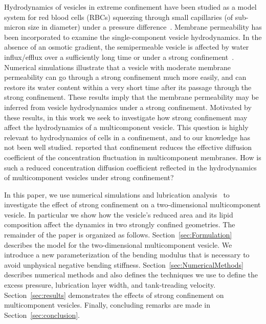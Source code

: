 \documentclass[twoside,twocolumn,9pt]{article}
\begin{document}
Hydrodynamics of vesicles in extreme confinement have been studied as a
model system for red blood cells (RBCs) squeezing through small
capillaries (of sub-micron size in diameter) under a pressure
difference~\cite{Freund2013_PoF, LuPeng2019_PoF, che-lyu-jae-leo2020,
gur-pak-tay-siv-sac2023}. Membrane permeability has been incorporated to
examine the single-component vesicle hydrodynamics. In the absence of an
osmotic gradient, the semipermeable vesicle is affected by water
influx/efflux over a sufficiently long time or under a strong
confinement~\cite{qua-gan-you2021}. Numerical simulations illustrate
that a vesicle with moderate membrane permeability can go through a
strong confinement much more easily, and can restore its water content
within a very short time after its passage through the strong
confinement. These results imply that the membrane permeability may be
inferred from vesicle hydrodynamics under a strong confinement.
Motivated by these results, in this work we seek to investigate how
strong confinement may affect the hydrodynamics of a multicomponent
vesicle. This question is highly relevant to hydrodynamics of cells in a
confinement, and to our knowledge has not been well studied.
\citet{ram-kom-sek-ima2010} reported that confinement reduces the
effective diffusion coefficient of the concentration fluctuation in
multicomponent membranes. How is such a reduced concentration diffusion
coefficient reflected in the hydrodynamics of multicomponent vesicles
under strong confinement?

In this paper, we use numerical simulations and lubrication
analysis~\cite{YoungStone2017_PRF,
mis-wis-ber-key-li-tun-law-per-erd-zha-zha-sun-kal-lam-kon2019} to
investigate the effect of strong confinement on a two-dimensional
multicomponent vesicle. In particular we show how the vesicle's reduced
area and its lipid composition affect the dynamics in two strongly
confined geometries.
%
The remainder of the paper is organized as follows.
Section~\ref{sec:Formulation} describes the model for the
two-dimensional multicomponent vesicle. We introduce a new
parameterization of the bending modulus that is necessary to avoid
unphysical negative bending stiffness.
Section~\ref{sec:NumericalMethods} describes numerical methods and also
defines the techniques we use to define the excess pressure, lubrication
layer width, and tank-treading velocity. Section~\ref{sec:results}
demonstrates the effects of strong confinement on multicomponent
vesicles. Finally, concluding remarks are made in
Section~\ref{sec:conclusion}.
\end{document}
